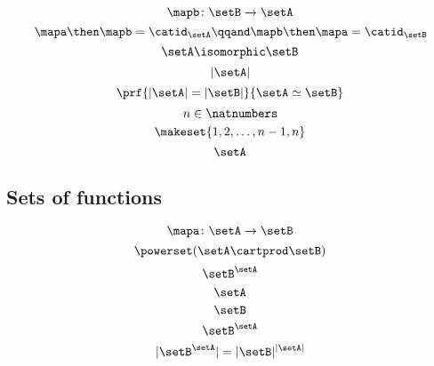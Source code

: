 \begin{forslides}
\begin{equation}\label{eq:slides_session2_148}
\mapb \colon \setB \to \setA
\end{equation}
\begin{equation}\label{eq:slides_session2_149}
\mapa \then \mapb = \catid_\setA
        \qqand
        \mapb \then \mapa = \catid_\setB
\end{equation}
\begin{equation}\label{eq:slides_session2_150}
\setA \isomorphic \setB
\end{equation}
\begin{equation}\label{eq:slides_session2_151}
\vert \setA \vert
\end{equation}
\begin{equation}\label{eq:slides_session2_152}
\prf{ \vert \setA \vert = \vert \setB \vert }{ \setA \simeq \setB }
\end{equation}
\begin{equation}\label{eq:slides_session2_153}
n \in \natnumbers
\end{equation}
\begin{equation}\label{eq:slides_session2_154}
\makeset{1,2, \dots, n-1, n}
\end{equation}
\begin{equation}\label{eq:slides_session2_155}
\setA
\end{equation}

\subsection{Sets of functions}

\begin{equation}\label{eq:slides_session2_156}
\mapa \colon \setA \to \setB
\end{equation}
\begin{equation}\label{eq:slides_session2_157}
\powerset (\setA \cartprod \setB)
\end{equation}
\begin{equation}\label{eq:slides_session2_158}
\setB^{\setA}
\end{equation}
\begin{equation}\label{eq:slides_session2_159}
\setA
\end{equation}
\begin{equation}\label{eq:slides_session2_160}
\setB
\end{equation}
\begin{equation}\label{eq:slides_session2_161}
\setB^{\setA}
\end{equation}
\begin{equation}\label{eq:slides_session2_162}
\vert \setB^{\setA} \vert = \vert \setB \vert^{\vert \setA \vert}
\end{equation}


\end{forslides}
